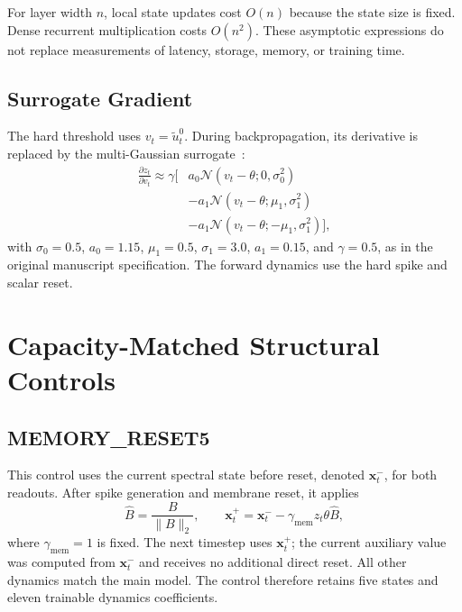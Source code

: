 \documentclass[letterpaper]{article}
\begin{document}
For layer width $n$, local state updates cost $O(n)$ because the state size is fixed. Dense recurrent multiplication costs $O(n^2)$. These asymptotic expressions do not replace measurements of latency, storage, memory, or training time.

\subsection{Surrogate Gradient}

The hard threshold uses $v_t=\widetilde u_t^0$. During backpropagation, its derivative is replaced by the multi-Gaussian surrogate~\cite{asrnn}:
\begin{equation}
\begin{aligned}
\frac{\partial z_t}{\partial v_t}\approx\gamma\big[&a_0\mathcal N(v_t-\theta;0,\sigma_0^2)\\
&-a_1\mathcal N(v_t-\theta;\mu_1,\sigma_1^2)\\
&-a_1\mathcal N(v_t-\theta;-\mu_1,\sigma_1^2)\big],
\end{aligned}
\label{eq:supp_surrogate}
\end{equation}
with $\sigma_0=0.5$, $a_0=1.15$, $\mu_1=0.5$, $\sigma_1=3.0$, $a_1=0.15$, and $\gamma=0.5$, as in the original manuscript specification. The forward dynamics use the hard spike and scalar reset.

\section{Capacity-Matched Structural Controls}

\subsection{MEMORY\_RESET5}

This control uses the current spectral state before reset, denoted $\mathbf x_t^-$, for both readouts. After spike generation and membrane reset, it applies
\begin{equation}
\widehat B=\frac{B}{\|B\|_2},\qquad
\mathbf x_t^+=\mathbf x_t^- -\gamma_{\mathrm{mem}}z_t\theta\widehat B,
\label{eq:supp_memory_reset}
\end{equation}
where $\gamma_{\mathrm{mem}}=1$ is fixed. The next timestep uses $\mathbf x_t^+$; the current auxiliary value was computed from $\mathbf x_t^-$ and receives no additional direct reset. All other dynamics match the main model. The control therefore retains five states and eleven trainable dynamics coefficients.
\end{document}
